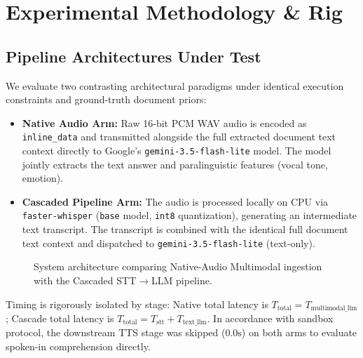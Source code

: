 \documentclass[10pt,a4paper,twocolumn]{article}
\begin{document}
\section{Experimental Methodology \& Rig}
\label{sec:methodology}

\subsection{Pipeline Architectures Under Test}
We evaluate two contrasting architectural paradigms under identical execution constraints and ground-truth document priors:
\begin{itemize}
    \item \textbf{Native Audio Arm:} Raw 16-bit PCM WAV audio is encoded as \texttt{inline\_data} and transmitted alongside the full extracted document text context directly to Google's \texttt{gemini-3.5-flash-lite} model. The model jointly extracts the text answer and paralinguistic features (vocal tone, emotion).
    \item \textbf{Cascaded Pipeline Arm:} The audio is processed locally on CPU via \texttt{faster-whisper} (\texttt{base} model, \texttt{int8} quantization), generating an intermediate text transcript. The transcript is combined with the identical full document text context and dispatched to \texttt{gemini-3.5-flash-lite} (text-only).
\end{itemize}

\begin{figure}[t]
\centering
{}
\caption{System architecture comparing Native-Audio Multimodal ingestion with the Cascaded STT$\to$LLM pipeline.}
\label{fig:architecture}
\end{figure}

Timing is rigorously isolated by stage: Native total latency is $T_{\text{total}} = T_{\text{multimodal\_llm}}$; Cascade total latency is $T_{\text{total}} = T_{\text{stt}} + T_{\text{text\_llm}}$. In accordance with sandbox protocol, the downstream TTS stage was skipped ($0.0\text{s}$) on both arms to evaluate spoken-in comprehension directly.
\end{document}

